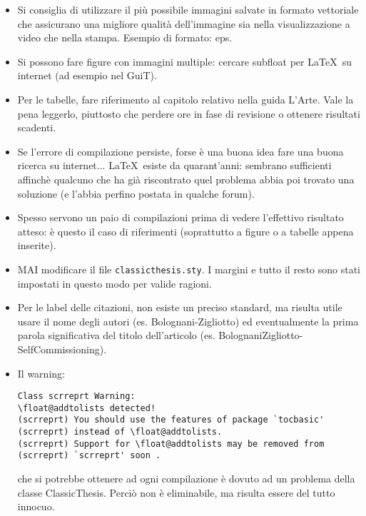 \documentclass[paper=a4, fontsize=11pt]{scrartcl}	%
\numberwithin{equation}{section}		%
\numberwithin{figure}{section}			%
\numberwithin{table}{section}				%
\begin{document}
\begin{itemize}
\item Si consiglia di utilizzare il pi\`u possibile immagini salvate in formato vettoriale che assicurano una migliore qualit\`a dell'immagine sia nella visualizzazione a video che nella stampa. Esempio di formato: eps.
\item Si possono fare figure con immagini multiple: cercare subfloat per \LaTeX~su internet (ad esempio nel GuiT).
\item Per le tabelle, fare riferimento al capitolo relativo nella guida L'Arte. Vale la pena leggerlo, piuttosto che perdere ore in fase di revisione o ottenere risultati scadenti.
\item Se l'errore di compilazione persiste, forse \`e una buona idea fare una buona ricerca su internet... \LaTeX~esiste da quarant'anni: sembrano sufficienti affinch\`e qualcuno che ha gi\`a riscontrato quel problema abbia poi trovato una soluzione (e l'abbia perfino postata in qualche forum).
\item Spesso servono un paio di compilazioni prima di vedere l'effettivo risultato atteso: \`e questo il caso di riferimenti (soprattutto a figure o a tabelle appena inserite).
\item MAI modificare il file \texttt{classicthesis.sty}. I margini e tutto il resto sono stati impostati in questo modo per valide ragioni.
\item Per le label delle citazioni, non esiste un preciso standard, ma risulta utile usare il nome degli autori (es. Bolognani-Zigliotto) ed eventualmente la prima parola significativa del titolo dell'articolo (es. BolognaniZigliotto-SelfCommissioning).
\item Il warning:
\begin{verbatim}
Class scrreprt Warning:
\float@addtolists detected!
(scrreprt) You should use the features of package `tocbasic'
(scrreprt) instead of \float@addtolists.
(scrreprt) Support for \float@addtolists may be removed from
(scrreprt) `scrreprt' soon .
\end{verbatim}
che si potrebbe ottenere ad ogni compilazione \`e dovuto ad un problema della classe ClassicThesis.
Perci\`o non \`e eliminabile, ma risulta essere del tutto innocuo.
\end{itemize}
\end{document}
